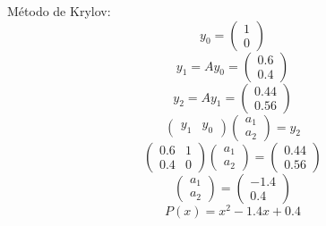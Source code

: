  \begin{frame}
  \begin{solution}
  Método de Krylov:\\
        \begin{equation*}
           y_{0}= \begin{pmatrix}1\\0 \end{pmatrix}
         \end{equation*}
         \begin{equation*}
           y_{1}=Ay_{0}= \begin{pmatrix}0.6\\0.4 \end{pmatrix}
         \end{equation*}
         \begin{equation*}
           y_{2}=Ay_{1}= \begin{pmatrix}0.44\\0.56 \end{pmatrix}
         \end{equation*}
         \begin{equation*}
            \begin{pmatrix}y_{1} & y_{0} \end{pmatrix}\begin{pmatrix}a_{1}\\a_{2} \end{pmatrix}=y_{2}
         \end{equation*}
         \begin{equation*}
            \begin{pmatrix}0.6 & 1\\0.4 &  0\end{pmatrix}\begin{pmatrix}a_{1}\\a_{2} \end{pmatrix}=\begin{pmatrix}0.44\\0.56 \end{pmatrix}
         \end{equation*}
         \begin{equation*}
            \begin{pmatrix}a_{1}\\a_{2} \end{pmatrix}=\begin{pmatrix}-1.4\\0.4 \end{pmatrix}
         \end{equation*}
         \begin{equation*}
            P(x)=x^{2}-1.4x+0.4
         \end{equation*}
  \end{solution}    
\end{frame}

